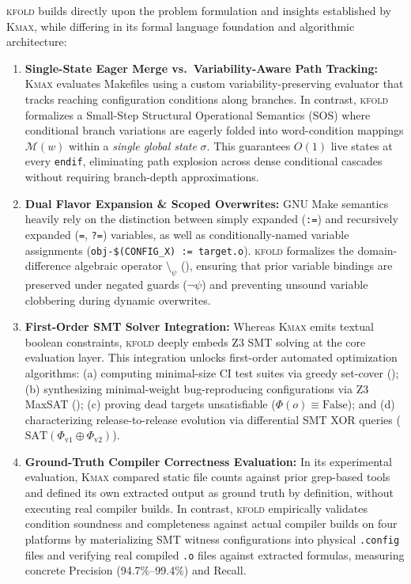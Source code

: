 \documentclass[acmsmall,screen,review]{acmart}
\newcommand{\tool}{\textsc{kfold}\xspace}
\begin{document}
\tool builds directly upon the problem formulation and insights established by \textsc{Kmax}, while differing in its formal language foundation and algorithmic architecture:
\begin{enumerate}
\item \textbf{Single-State Eager Merge vs.\ Variability-Aware Path Tracking:} \textsc{Kmax} evaluates Makefiles using a custom variability-preserving evaluator that tracks reaching configuration conditions along branches. In contrast, \tool formalizes a Small-Step Structural Operational Semantics (SOS) where conditional branch variations are eagerly folded into word-condition mappings $\mathcal{M}(w)$ within a \emph{single global state} $\sigma$. This guarantees $O(1)$ live states at every \texttt{endif}, eliminating path explosion across dense conditional cascades without requiring branch-depth approximations.
\item \textbf{Dual Flavor Expansion \& Scoped Overwrites:} GNU Make semantics heavily rely on the distinction between simply expanded (\texttt{:=}) and recursively expanded (\texttt{=}, \texttt{?=}) variables, as well as conditionally-named variable assignments (\texttt{obj-\$(CONFIG\_X) := target.o}). \tool formalizes the domain-difference algebraic operator $\setminus_\psi$ (), ensuring that prior variable bindings are preserved under negated guards ($\neg \psi$) and preventing unsound variable clobbering during dynamic overwrites.
\item \textbf{First-Order SMT Solver Integration:} Whereas \textsc{Kmax} emits textual boolean constraints, \tool deeply embeds Z3 SMT solving at the core evaluation layer. This integration unlocks first-order automated optimization algorithms: (a) computing minimal-size CI test suites via greedy set-cover (); (b) synthesizing minimal-weight bug-reproducing configurations via Z3 MaxSAT (); (c) proving dead targets unsatisfiable ($\Phi(o) \equiv \text{False}$); and (d) characterizing release-to-release evolution via differential SMT XOR queries ($\text{SAT}(\Phi_{\text{v1}} \oplus \Phi_{\text{v2}})$).
\item \textbf{Ground-Truth Compiler Correctness Evaluation:} In its experimental evaluation, \textsc{Kmax} compared static file counts against prior grep-based tools and defined its own extracted output as ground truth by definition, without executing real compiler builds. In contrast, \tool empirically validates condition soundness and completeness against actual compiler builds on four platforms by materializing SMT witness configurations into physical \texttt{.config} files and verifying real compiled \texttt{.o} files against extracted formulas, measuring concrete Precision (94.7\%--99.4\%) and Recall.

\end{enumerate}
\end{document}
